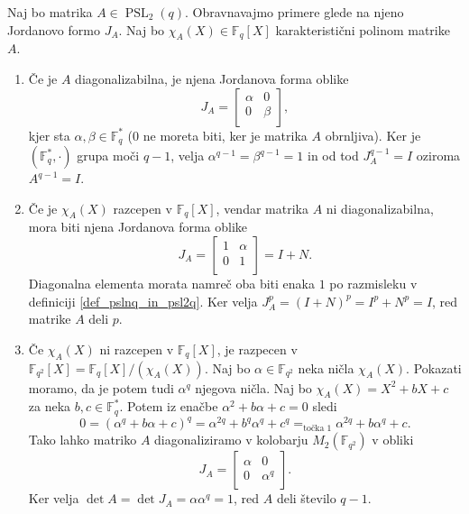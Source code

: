     \begin{dokaz}
    Naj bo matrika $A \in \operatorname{PSL}_2(q)$. Obravnavajmo primere glede na njeno Jordanovo formo $J_A$. Naj bo $\chi_A(X) \in \mathbb{F}_q[X]$ karakteristični polinom matrike $A$. 
    \begin{enumerate}
        \item Če je $A$ diagonalizabilna, je njena Jordanova forma oblike \begin{equation*}
        J_A = \begin{bmatrix}
            \alpha & 0 \\
            0 & \beta \\
        \end{bmatrix},
        \end{equation*}  
          kjer sta $\alpha, \beta \in  \mathbb{F}_q^{*}$ (0 ne moreta biti, ker je matrika $A$ obrnljiva). Ker je $(\mathbb{F}_q^{*}, \cdot)$ grupa moči $q-1$, velja $\alpha^{q-1} = \beta^{q -1} = 1$ in od tod $J_A^{q-1} = I$ oziroma $A^{q-1} = I$.
          \item Če je $\chi_A(X)$ razcepen v $\mathbb{F}_q[X]$, vendar matrika $A$ ni diagonalizabilna, mora biti njena Jordanova forma oblike \begin{equation*}
          J_A =  \begin{bmatrix}
            1 & \alpha\\
            0 & 1\\
          \end{bmatrix} = I + N.
          \end{equation*}  
        Diagonalna elementa morata namreč oba biti enaka $1$ po razmisleku v definiciji \ref{def_pslnq_in_psl2q}. Ker velja $J_A^{p} = (I + N)^{p} = I^{p} + N^{p} = I$, red matrike $A$ deli $p$.  
    \item Če $\chi_A(X)$ ni razcepen v $\mathbb{F}_q[X]$, je razpecen v  $\mathbb{F}_{q^2}[X] = \mathbb{F}_q[X] / (\chi_A(X))$. Naj bo $\alpha \in \mathbb{F}_{q^2}$ neka ničla $\chi_A(X)$. Pokazati moramo, da je potem tudi $\alpha^q$ njegova ničla.
    Naj bo $\chi_A(X) = X^2 + bX + c$ za neka $b ,c \in \mathbb{F}_q^{*}$. Potem iz enačbe $\alpha^2 + b \alpha + c  = 0$ sledi \begin{equation*}
    0 = (\alpha^{q} + b \alpha + c)^q =  \alpha^{2q} + b^{q} \alpha^{q} + c^{q} =_\text{točka 1} \alpha^{2q} + b \alpha^{q} + c.    
    \end{equation*}  
    Tako lahko matriko $A$ diagonaliziramo v kolobarju $M_2(\mathbb{F}_{q^2})$ v obliki \begin{equation*}
    J_A = \begin{bmatrix}
        \alpha & 0\\
        0 & \alpha^{q}\\
    \end{bmatrix}.
    \end{equation*}  
    Ker velja $\det A = \det J_A  = \alpha \alpha^{q} = 1$, red $A$ deli število $q-1$.
    \end{enumerate}   
\end{dokaz}
